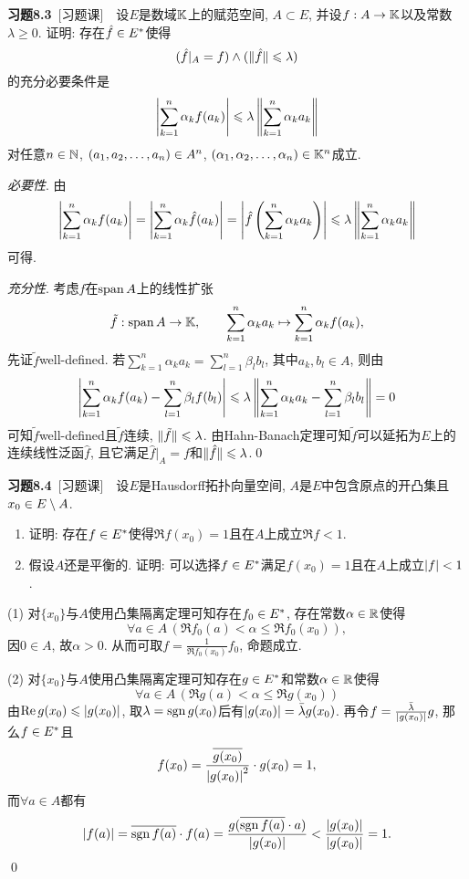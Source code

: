 	\textbf{习题8.3}\ [习题课]\ \ 设$ E $是数域$ \mathbb{K} $上的赋范空间, $ A\subset E $, 并设$ f : A\to\mathbb{K} $以及常数$ \lambda\geqslant 0 $. 证明: 存在$ \hat{f}\in E^{*} $使得
	\[
	(\hat{f}\rvert_A=f)\land (\lVert \hat{f}\rVert\leqslant\lambda)
	\]
	的充分必要条件是
	\[
	\left| \sum_{k=1}^n\alpha_kf(a_k) \right| \leqslant\lambda\left\| \sum_{k=1}^n\alpha_ka_k \right\|
	\]
	对任意$ n\in\mathbb{N} $, $ (a_{1}, a_{2}, \dots, a_{n})\in A^n $, $ (\alpha_{1}, \alpha_{2}, \dots, \alpha_{n})\in\mathbb{K}^n $成立.
	\begin{Proof}
	\textsl{必要性}. 由
	\[
	\left| \sum_{k=1}^n\alpha_kf(a_k) \right| =\left| \sum_{k=1}^n\alpha_k\hat{f}(a_k) \right| =\left| \hat{f}\left( \sum_{k=1}^n\alpha_ka_k \right) \right| \leqslant\lambda\left\| \sum_{k=1}^n\alpha_ka_k \right\|
	\]
	可得.
	
	\textsl{充分性}. 考虑$ f $在$ \operatorname{span} A $上的线性扩张
	\[
	\tilde{f} : \operatorname{span} A\to\mathbb{K},\qquad \sum_{k=1}^n\alpha_ka_k\mapsto\sum_{k=1}^n\alpha_kf(a_k),
	\]
	先证$ \tilde{f} $well-defined. 若$ \sum\limits_{k=1}^n\alpha_ka_k=\sum\limits_{l=1}^n\beta_lb_l $, 其中$ a_k, b_l\in A $, 则由
	\[
	\left| \sum_{k=1}^n\alpha_kf(a_k)-\sum_{l=1}^n\beta_lf(b_l) \right| \leqslant\lambda\left\| \sum_{k=1}^n\alpha_ka_k-\sum_{l=1}^n\beta_lb_l \right\|=0
	\]
	可知$ \tilde{f} $well-defined且$ \tilde{f} $连续, $ \lVert \tilde{f}\rVert\leqslant\lambda $. 由Hahn-Banach定理可知$ \tilde{f} $可以延拓为$ E $上的连续线性泛函$ \hat{f} $, 且它满足$ \hat{f}\rvert_A=f $和$ \lVert \hat{f}\rVert\leqslant\lambda $.\qed
	\end{Proof}
	
	\textbf{习题8.4}\ [习题课]\ \ 设$ E $是Hausdorff拓扑向量空间, $ A $是$ E $中包含原点的开凸集且$ x_0\in E\setminus A $.
	\begin{enumerate}[(1)]
	\item 证明: 存在$ f\in E^{*} $使得$ \Re f(x_0)=1 $且在$ A $上成立$ \Re f<1 $.
	\item 假设$ A $还是平衡的. 证明: 可以选择$ f\in E^{*} $满足$ f(x_0)=1 $且在$ A $上成立$ \left| f \right| <1 $.
	\end{enumerate}
	\begin{Proof}
	(1) 对$ \{x_0\} $与$ A $使用凸集隔离定理可知存在$ f_0\in E^{*} $, 存在常数$ \alpha\in\mathbb{R} $使得
	\[
	\forall a\in A\,(\Re f_0(a)<\alpha\leqslant\Re f_0(x_0)),
	\]
	因$ 0\in A $, 故$ \alpha>0 $. 从而可取$ f=\frac{1}{\Re f_0(x_0)}f_0 $, 命题成立.
	
	(2) 对$ \{ x_0 \} $与$ A $使用凸集隔离定理可知存在$ g\in E^{*} $和常数$ \alpha\in\mathbb{R} $使得
	\[
	\forall a\in A\,(\Re g(a)<\alpha\leqslant\Re g(x_0))
	\]
	由$ \mathrm{Re\,} g(x_0)\leqslant\left| g(x_0) \right|  $, 取$ \lambda=\mathrm{sgn}\, g(x_0) $后有$ \left| g(x_0) \right| =\bar{\lambda}g(x_0) $. 再令$ f=\frac{\bar{\lambda}}{\left| g(x_0) \right| }g $, 那么$ f\in E^{*} $且
	\[
	f(x_0)=\frac{\overline{g(x_0)}}{\left| g(x_0) \right| ^2}\cdot g(x_0)=1,
	\]
	而$ \forall a\in A $都有
	\[
	\left| f(a) \right| =\overline{\mathrm{sgn}\, f(a)}\cdot f(a)=\frac{g(\overline{\mathrm{sgn}\, f(a)}\cdot a)}{\left| g(x_0) \right| }<\frac{\left| g(x_0) \right| }{\left| g(x_0) \right| }=1.
	\]
	\qed
	\end{Proof}
	
